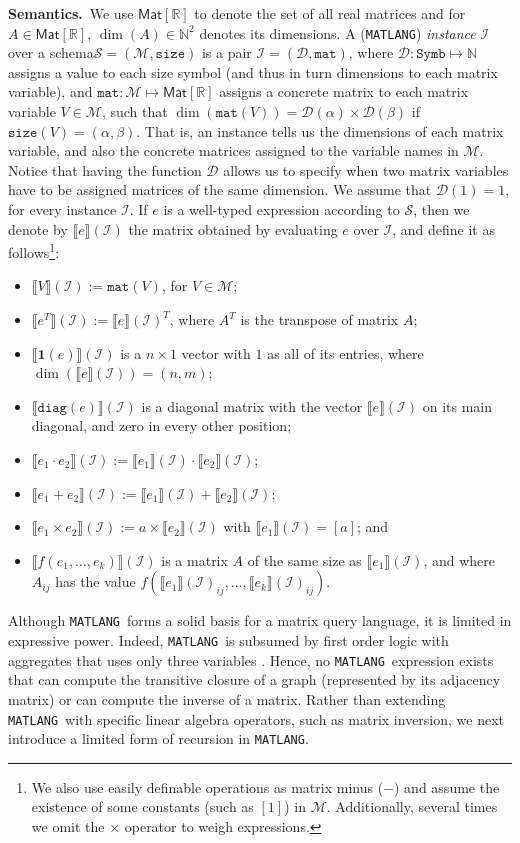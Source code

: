\documentclass[sigconf]{acmart}
\newcommand{\NN}{\mathbb{N}}
\newcommand{\RR}{\mathbb{R}}
\newcommand{\sem}[2]{\llbracket #1 \rrbracket(#2)}
\newcommand{\Mnam}{\mathcal{M}}
\newcommand{\ones}{\mathbf{1}}
\newcommand{\diag}{\texttt{diag}}
\newcommand{\I}{\mathcal{I}}
\newcommand{\Sch}{\mathcal{S}}
\newcommand{\mtr}[1]{\textsf{Mat}[#1]}
\newcommand{\dom}{\mathcal{D}}
\newcommand{\conc}{\texttt{mat}}
\newcommand{\DD}{\texttt{Symb}}
\newcommand{\size}{\texttt{size}}
\newcommand{\lang}{\texttt{MATLANG}\xspace}
\begin{document}
\smallskip
\noindent
\textbf{Semantics.}\, We use $\mtr{\RR}$ to denote the set of all real matrices and for 
$A\in\mtr{\RR}$, $\dim(A)\in\NN^2$ denotes its dimensions.
A (\lang) \textit{instance} $\I$ over a schema$\Sch=(\Mnam,\size)$ is a pair $\I = (\dom,\conc)$, where $\dom : \DD \mapsto \NN$ assigns a value to each size symbol (and thus in turn  dimensions to each matrix variable), and $\conc : \Mnam \mapsto \mtr{\RR}$ assigns a concrete matrix to each matrix variable $V\in \Mnam$, such that $\dim(\conc(V)) = \dom(\alpha)\times \dom(\beta)$ if $\size(V) = (\alpha,\beta)$. That is, an instance tells us the dimensions of each matrix variable, and also the concrete matrices assigned to the variable names in $\Mnam$. Notice that having the function $\dom$ allows us to specify when two matrix variables have to be assigned matrices of the same dimension. We assume that $\dom(1) = 1$, for every instance $\I$. If $e$ is a well-typed expression according to $\Sch$, then we denote by $\sem{e}{\I}$ the matrix obtained by evaluating $e$ over $\I$, and define it as follows\footnote{We also use easily definable operations as matrix minus ($-$) and assume the existence of some constants (such as $[1]$) in $\Mnam$. Additionally, several times we omit the $\times$ operator to weigh expressions.}:
\begin{itemize}
\item $\sem{V}{\I} := \conc(V)$, for $V\in \Mnam$;
\item $\sem{e^T}{\I} := \sem{e}{\I}^T$, where $A^T$ is the transpose of matrix $A$;
\item $\sem{\ones(e)}{\I}$ is a $n\times 1$ vector with $1$ as all of its entries, where $\dim(\sem{e}{\I})=(n,m)$;
\item $\sem{\diag(e)}{\I}$ is a diagonal matrix with the vector $\sem{e}{\I}$ on its main diagonal, and zero in every other position;
\item $\sem{e_1\cdot e_2}{\I} := \sem{e_1}{\I} \cdot \sem{e_2}{\I}$;
\item $\sem{e_1+ e_2}{\I} := \sem{e_1}{\I} + \sem{e_2}{\I}$;
\item $\sem{e_1\times e_2}{\I} := a\times \sem{e_2}{\I}$ with $\sem{e_1}{\I}=[a]$; and
\item $\sem{f(e_1,\ldots ,e_k)}{\I}$ is a matrix $A$ of the same size as $\sem{e_1}{\I}$, and where $A_{ij}$ has the value $f(\sem{e_1}{\I}_{ij},\ldots ,\sem{e_k}{\I}_{ij})$.
\end{itemize}

\noindent
Although \lang\ forms a solid basis for a matrix query language, it is limited in expressive power. Indeed, \lang\ is subsumed by first order logic with aggregates that uses only three variables \cite{matlang-journal}. 
Hence, no \lang\ expression exists that can compute the transitive closure of a graph (represented by its adjacency matrix) or can compute the inverse of a matrix. Rather than extending \lang\ with specific linear algebra operators, such as matrix inversion, we  
next introduce a limited form of recursion in \lang.
\end{document}
